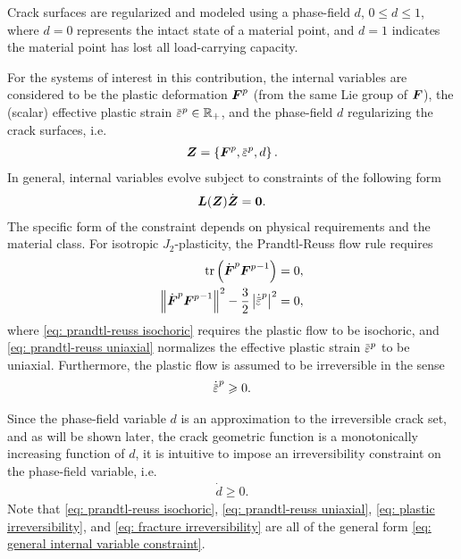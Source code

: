 Crack surfaces are regularized and modeled using a phase-field $d$, $0 \leqslant d \leqslant 1$, where $d = 0$ represents the intact state of a material point, and $d = 1$ indicates the material point has lost all load-carrying capacity.

For the systems of interest in this contribution, the internal variables are considered to be the plastic deformation $\boldsymbol{F}^p$ (from the same Lie group of $\boldsymbol{F}$), the (scalar) effective plastic strain $\ep \in \mathbb{R}_+$, and the phase-field $d$ regularizing the crack surfaces, i.e.
\begin{align}
  \bfZ = \left\{ \bfF^p, \ep, d \right\}.
\end{align}
In general, internal variables evolve subject to constraints of the following form
\begin{align}
  \boldsymbol{L}(\boldsymbol{Z})\dot{\boldsymbol{Z}} = \boldsymbol{0}. \label{eq: general internal variable constraint}
\end{align}
The specific form of the constraint depends on physical requirements and the material class. For isotropic $J_2$-plasticity, the Prandtl-Reuss flow rule requires
\begin{subequations}
  \begin{align}
    \tr\left( \dot{\bfF}^p {\bfF^p}^{-1} \right)                     & = 0, \label{eq: prandtl-reuss isochoric} \\
    \norm{\dot{\bfF}^p {\bfF^p}^{-1}}^2 - \dfrac{3}{2}\abs{\epdot}^2 & = 0, \label{eq: prandtl-reuss uniaxial}  
  \end{align}
\end{subequations}
where \eqref{eq: prandtl-reuss isochoric} requires the plastic flow to be isochoric, and \eqref{eq: prandtl-reuss uniaxial} normalizes the effective plastic strain $\ep$ to be uniaxial. Furthermore, the plastic flow is assumed to be irreversible in the sense
\begin{align}
  \epdot \geqslant 0. \label{eq: plastic irreversibility}
\end{align}

Since the phase-field variable $d$ is an approximation to the irreversible crack set, and as will be shown later, the crack geometric function is a monotonically increasing function of $d$, it is intuitive to impose an irreversibility constraint on the phase-field variable, i.e.
\begin{align}
  \dot{d} \geqslant 0. \label{eq: fracture irreversibility}
\end{align}
Note that \eqref{eq: prandtl-reuss isochoric}, \eqref{eq: prandtl-reuss uniaxial}, \eqref{eq: plastic irreversibility}, and \eqref{eq: fracture irreversibility} are all of the general form \eqref{eq: general internal variable constraint}.
